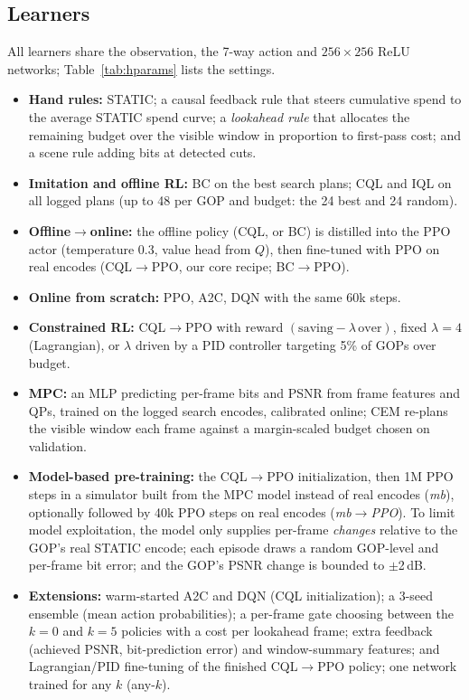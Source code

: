 \documentclass[conference]{IEEEtran}
\newcommand{\cqlppo}{CQL$\to$PPO}
\newcommand{\bcppo}{BC$\to$PPO}
\begin{document}
\subsection{Learners}
All learners share the observation, the 7-way action and $256{\times}256$ ReLU networks; Table~\ref{tab:hparams} lists the settings.
\begin{itemize}
\item \textbf{Hand rules:} STATIC; a causal feedback rule that steers cumulative spend to the average STATIC spend curve; a \emph{lookahead rule} that allocates the remaining budget over the visible window in proportion to first-pass cost; and a scene rule adding bits at detected cuts.
\item \textbf{Imitation and offline RL:} BC on the best search plans; CQL and IQL on all logged plans (up to 48 per GOP and budget: the 24 best and 24 random).
\item \textbf{Offline$\to$online:} the offline policy (CQL, or BC) is distilled into the PPO actor (temperature 0.3, value head from $Q$), then fine-tuned with PPO on real encodes (\cqlppo, our core recipe; \bcppo).
\item \textbf{Online from scratch:} PPO, A2C, DQN with the same 60k steps.
\item \textbf{Constrained RL:} \cqlppo{} with reward $(\text{saving} - \lambda\,\text{over})$, fixed $\lambda{=}4$ (Lagrangian), or $\lambda$ driven by a PID controller targeting 5\% of GOPs over budget.
\item \textbf{MPC:} an MLP predicting per-frame bits and PSNR from frame features and QPs, trained on the logged search encodes, calibrated online; CEM re-plans the visible window each frame against a margin-scaled budget chosen on validation.
\item \textbf{Model-based pre-training:} the \cqlppo{} initialization, then 1M PPO steps in a simulator built from the MPC model instead of real encodes (\emph{mb}), optionally followed by 40k PPO steps on real encodes (\emph{mb$\to$PPO}). To limit model exploitation, the model only supplies per-frame \emph{changes} relative to the GOP's real STATIC encode; each episode draws a random GOP-level and per-frame bit error; and the GOP's PSNR change is bounded to $\pm$2\,dB.
\item \textbf{Extensions:} warm-started A2C and DQN (CQL initialization); a 3-seed ensemble (mean action probabilities); a per-frame gate choosing between the $k{=}0$ and $k{=}5$ policies with a cost per lookahead frame; extra feedback (achieved PSNR, bit-prediction error) and window-summary features; and Lagrangian/PID fine-tuning of the finished \cqlppo{} policy; one network trained for any $k$ (any-$k$).
\end{itemize}
\end{document}
